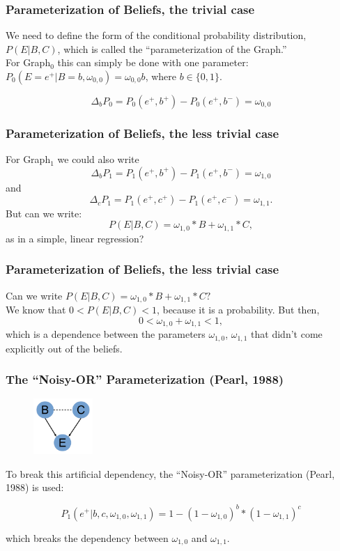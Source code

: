 \documentclass{beamer}
\begin{document}
\begin{frame}
\frametitle{Parameterization of Beliefs, the trivial case}
We need to define the form of the conditional probability distribution, $P(E | B, C)$, which is called the ``parameterization of the Graph.'' \\

For Graph$_0$ this can simply be done with one parameter: $P_0(E=e^+ | B=b, \omega_{0, 0})=\omega_{0, 0}b$, where $b \in \{0, 1\}$.

$$\Delta_b P_0= P_0(e^+, b^+)-P_0(e^+, b^-) = \omega_{0, 0}$$
\end{frame}

\begin{frame}
\frametitle{Parameterization of Beliefs, the less trivial case}

For Graph$_1$ we could also write
$$\Delta_b P_1= P_1(e^+, b^+)-P_1(e^+, b^-) = \omega_{1, 0}$$
and
$$\Delta_c P_1= P_1(e^+, c^+)-P_1(e^+, c^-) = \omega_{1, 1}.$$
But can we write:
$$P(E | B, C)= \omega_{1, 0}*B + \omega_{1, 1}*C,$$
as in a simple, linear regression?
\end{frame}

\begin{frame}
\frametitle{Parameterization of Beliefs, the less trivial case}
Can we write $P(E | B, C)= \omega_{1, 0}*B + \omega_{1, 1}*C?$\\
We know that $0<P(E | B, C) < 1$, because it is a probability. But then,
$$0<\omega_{1, 0} + \omega_{1, 1} <1,$$
which is a dependence between the parameters $\omega_{1, 0}$, $\omega_{1, 1}$ that didn't come explicitly out of the beliefs.
\end{frame}

\begin{frame}
\frametitle{The ``Noisy-OR'' Parameterization (Pearl, 1988)}
\begin{figure}

 \centering
    \includegraphics[width=0.2\textwidth]{GraphDep.pdf}
\end{figure}
To break this artificial dependency, the ``Noisy-OR'' parameterization (Pearl, 1988) is used:

$$P_1(e^+ | b, c, \omega_{1, 0}, \omega_{1, 1})=1-(1-\omega_{1, 0})^b *(1-\omega_{1, 1})^c$$

which breaks the dependency between $\omega_{1, 0}$ and $\omega_{1, 1}$.
\end{frame}
\end{document}
